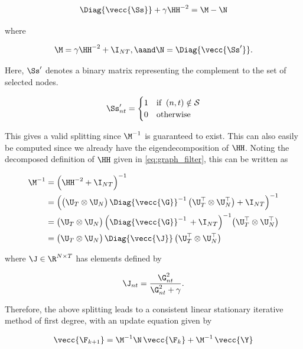 \begin{equation}
    \Diag{\vecc{\Ss}} + \gamma  \HH^{-2} =  \M - \N
\end{equation}

\noindent where 

\begin{equation}
    \M = \gamma \HH^{-2} + \I_{NT}, \aand \N = \Diag{\vecc{\Ss'}}.
\end{equation}

 Here, $\Ss'$ denotes a binary matrix representing the complement to the set of selected nodes.
 
 \begin{equation}
    \Ss'_{nt} = \begin{cases}
        1 & \text{if} \;\; (n, t) \notin \mathcal{S} \\
        0 & \text{otherwise}
    \end{cases}
\end{equation}
 
This gives a valid splitting since $\M^{-1}$ is guaranteed to exist. This can also easily be computed since we already have the eigendecomposition of $\HH$. Noting the decomposed definition of $\HH$ given in \cref{eq:graph_filter}, this can be written as 

\begin{align}
\label{eq:inv}
\M^{-1} &= \Big( \HH^{-2} + \I_{NT}\Big)^{-1} \notag \\
 &= \Big( \big(\U_T \otimes \U_N\big)\, \Diag{\vecc{\G}}^{-1}\,  \big(\U_T^\top \otimes \U_N^\top\big)  + \I_{NT} \Big)^{-1} \notag \\
 &= \big(\U_T \otimes \U_N\big)\, \Big(  \Diag{\vecc{\G}}^{-1}\,    + \I_{NT} \Big)^{-1} \big(\U_T^\top \otimes \U_N^\top\big) \notag \\
&= \big(\U_T \otimes \U_N\big)\, \Diag{\vecc{\J}}\,  \big(\U_T^\top \otimes \U_N^\top\big) 
\end{align}
 
\noindent where $\J \in \R^{N \times T}$ has elements defined by 

\begin{equation}
    \J_{nt} = \frac{\G_{nt}^2}{\G_{nt}^2 + \gamma}.
\end{equation}

Therefore, the above splitting leads to a consistent linear stationary iterative method of first degree, with an update equation given by
 
\begin{equation}
\label{eq:split_update}
\vecc{\F_{k+1}} = \M^{-1} \N \,  \vecc{\F_k} + \M^{-1} \, \vecc{\Y}
\end{equation}

